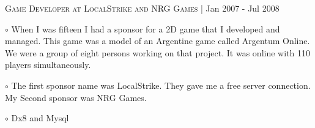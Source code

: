 \documentclass[letterpaper]{article}
\renewenvironment{itemize}{
  \begin{list}{}{
    \setlength{\leftmargin}{1.5em}
  }
}{
  \end{list}
}
\newenvironment{no-indent-itemize}{
  \begin{list}{}{
    \setlength{\leftmargin}{0em}
  }
}{
  \end{list}
}
\def\bullet{$\circ$\xspace}
\begin{document}
\begin{no-indent-itemize}
    
    \item \textsc{Game Developer at LocalStrike and NRG Games} | Jan 2007 - Jul 2008
    \begin{itemize} 
    
    \item\bullet
    When I was fifteen I had a sponsor for a 2D game that I developed and managed. This game was a model of an Argentine game called Argentum Online. We were a group of eight persons working on that project. It was online with 110 players simultaneously.
    \item\bullet The first sponsor name was LocalStrike. They gave me a free server connection. My Second sponsor was NRG Games.
    \item\bullet Dx8 and Mysql
    \end{itemize}


\end{no-indent-itemize}
\end{document}
